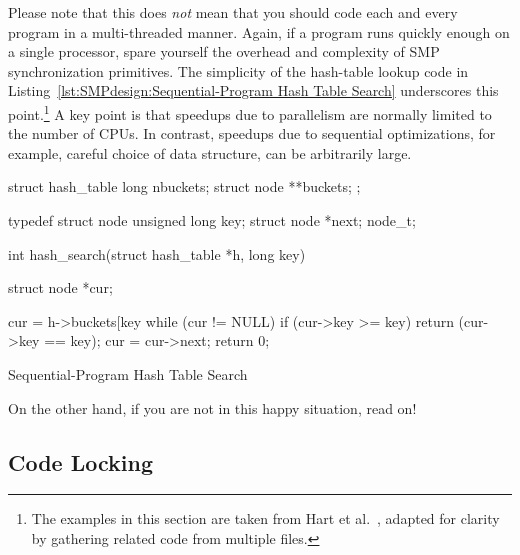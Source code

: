 Please note that this does \emph{not} mean that you should code each
and every program in a multi-threaded manner.
Again, if a program runs quickly enough on a single processor,
spare yourself the overhead and complexity of SMP synchronization
primitives.
The simplicity of the hash-table lookup code in
Listing~\ref{lst:SMPdesign:Sequential-Program Hash Table Search}
underscores this point.\footnote{
	The examples in this section are taken from Hart et
	al.~\cite{ThomasEHart2006a}, adapted for clarity
	by gathering related code from multiple files.}
A key point is that speedups due to parallelism are normally
limited to the number of CPUs.
In contrast, speedups due to sequential optimizations, for example,
careful choice of data structure, can be arbitrarily large.

\begin{listing}[tbhp]
\begin{VerbatimL}[commandchars=\\\[\]]
struct hash_table
{
	long nbuckets;
	struct node **buckets;
};

typedef struct node {
	unsigned long key;
	struct node *next;
} node_t;

int hash_search(struct hash_table *h, long key)
{
	struct node *cur;

	cur = h->buckets[key %
	while (cur != NULL) {
		if (cur->key >= key) {
			return (cur->key == key);
		}
		cur = cur->next;
	}
	return 0;
}
\end{VerbatimL}
\caption{Sequential-Program Hash Table Search}
\label{lst:SMPdesign:Sequential-Program Hash Table Search}
\end{listing}


On the other hand, if you are not in this happy situation, read on!

\subsection{Code Locking}
\label{sec:SMPdesign:Code Locking}

